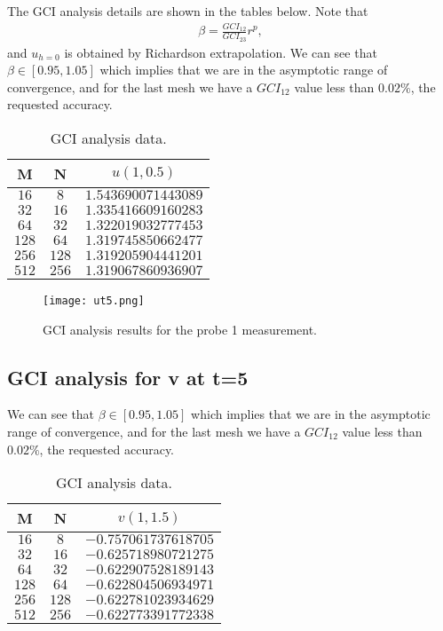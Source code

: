 The GCI analysis details are shown in the tables below. Note that 
\begin{align*}
\beta=\frac{GCI_{12}}{GCI_{23}}r^p,
\end{align*}
and $u_{h=0}$ is obtained by Richardson extrapolation. We can see that $\beta\in[0.95,1.05]$ which implies that we are in the asymptotic range of convergence, and for the last mesh we have a $GCI_{12}$ value less than $0.02\%$, the requested accuracy.
\begin{table}[H]
\centering
\begin{tabular}{|c|c|c|}
M & N & $u(1,0.5)$ \\
\hline
$16$ & $8$ & $1.543690071443089$ \\
$32$ & $16$ & $   1.335416609160283$ \\
$64$ & $32$ & $   1.322019032777453$ \\
$128$ & $64$ & $   1.319745850662477$ \\
$256$ & $128$ & $   1.319205904441201$ \\
$512$ & $256$ & $   1.319067860936907$ \\
\end{tabular}
\caption{GCI analysis data.}
\end{table}

\begin{figure}[H]
\centering     %
\texttt{[image: ut5.png]}
\caption{GCI analysis results for the probe 1 measurement.}
\end{figure}

\subsection*{GCI analysis for v at t=5}

We can see that $\beta\in[0.95,1.05]$ which implies that we are in the asymptotic range of convergence, and for the last mesh we have a $GCI_{12}$ value less than $0.02\%$, the requested accuracy.

\begin{table}[H]
\centering
\begin{tabular}{|c|c|c|}
M & N & $v(1,1.5)$ \\
\hline
$16$ & $8$ & $  -0.757061737618705$ \\
$32$ & $16$ & $  -0.625718980721275$ \\
$64$ & $32$ & $  -0.622907528189143$ \\
$128$ & $64$ & $  -0.622804506934971$ \\
$256$ & $128$ & $  -0.622781023934629$ \\
$512$ & $256$ & $	-0.622773391772338$ \\
\end{tabular}
\caption{GCI analysis data.}
\end{table}

